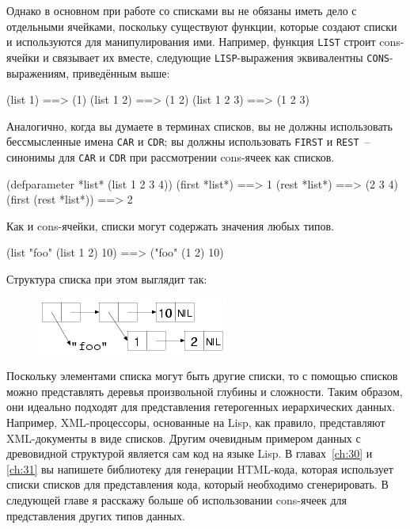 Однако в основном при работе со списками вы не обязаны иметь дело с отдельными ячейками,
поскольку существуют функции, которые создают списки и используются для манипулирования
ими. Например, функция \lstinline{LIST} строит cons-ячейки и связывает их вместе, следующие
\lstinline{LISP}-выражения эквивалентны \lstinline{CONS}-выражениям, приведённым выше:

\begin{myverb}
(list 1)     ==> (1)
(list 1 2)   ==> (1 2)
(list 1 2 3) ==> (1 2 3)
\end{myverb}

Аналогично, когда вы думаете в терминах списков, вы не должны использовать бессмысленные
имена \lstinline{CAR} и \lstinline{CDR}; вы должны использовать \lstinline{FIRST} и \lstinline{REST}~--
синонимы для \lstinline{CAR} и \lstinline{CDR} при рассмотрении cons-ячеек как списков.

\begin{myverb}
(defparameter *list* (list 1 2 3 4))
(first *list*)        ==> 1
(rest *list*)         ==> (2 3 4)
(first (rest *list*)) ==> 2
\end{myverb}

Как и cons-ячейки, списки могут содержать значения любых типов.

\begin{myverb}
(list "foo" (list 1 2) 10) ==> ("foo" (1 2) 10)
\end{myverb}

Структура списка при этом выглядит так:

\begin{figure}[h]
  \centering
  \includegraphics[scale=0.6]{images/mixed-list.png}
\end{figure}

Поскольку элементами списка могут быть другие списки, то с помощью списков можно представлять
деревья произвольной глубины и сложности. Таким образом, они идеально подходят для
представления гетерогенных иерархических данных. Например, XML-процессоры, основанные на
Lisp, как правило, представляют XML-документы в виде списков. Другим очевидным примером
данных с древовидной структурой является сам код на языке Lisp. В главах~\ref{ch:30} и
\ref{ch:31} вы
напишете библиотеку для генерации HTML-кода, которая использует списки списков для
представления кода, который необходимо сгенерировать. В следующей главе я расскажу больше
об использовании cons-ячеек для представления других типов данных.

